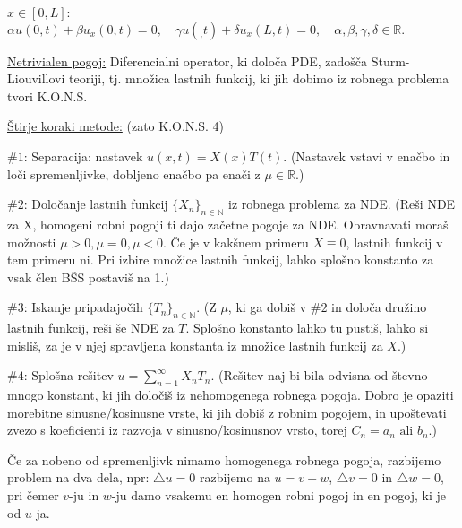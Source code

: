 \documentclass[8pt,a4paper]{amsart}
\theoremstyle{definition} %
\theoremstyle{plain} %
\newcommand{\R}{\mathbb R}
\newcommand{\N}{\mathbb N}
\begin{document}
$x \in [0,L]$: $\alpha u(0,t) + \beta u_x(0,t) = 0, \quad \gamma u(_,t)+\delta
u_x(L,t) = 0, \quad \alpha, \beta, \gamma, \delta \in \R.$

\underline{Netrivialen pogoj:} Diferencialni operator, ki določa PDE, zadošča
Sturm-Liouvillovi teoriji, tj. množica lastnih funkcij, ki jih dobimo iz robnega
problema tvori K.O.N.S.


\underline{Štirje koraki metode:} (zato K.O.N.S. 4)

$\#1$: Separacija: nastavek $u(x,t)=X(x)T(t)$. (Nastavek vstavi v enačbo in loči
spremenljivke, dobljeno enačbo pa enači z $\mu \in \R$.)

$\#2$: Določanje lastnih funkcij $\{X_n\}_{n\in \N}$ iz robnega problema za NDE.
(Reši NDE za X, homogeni robni pogoji ti dajo začetne pogoje za NDE. Obravnavati
moraš možnosti $\mu >0, \mu = 0, \mu < 0$. Če je v kakšnem primeru $X \equiv 0$,
lastnih funkcij v tem primeru ni. Pri izbire množice lastnih funkcij, lahko
splošno konstanto za vsak člen BŠS postaviš na 1.)

$\#3$: Iskanje pripadajočih $\{T_n \}_{n \in \N}$. (Z $\mu$, ki ga dobiš v $\#2$
in določa družino lastnih funkcij, reši še NDE za $T$. Splošno konstanto lahko
tu pustiš, lahko si misliš, za je v njej spravljena konstanta iz množice lastnih
funkcij za $X$.)

$\#4$: Splošna rešitev $u = \sum_{n=1}^\infty X_nT_n$. (Rešitev naj bi bila
odvisna od števno mnogo konstant, ki jih določiš iz nehomogenega robnega pogoja.
Dobro je opaziti morebitne sinusne/kosinusne vrste, ki jih dobiš z robnim
pogojem, in upoštevati zvezo s koeficienti iz razvoja v sinusno/kosinusnov
vrsto, torej $C_n = a_n \text{ ali } b_n$.)

Če za nobeno od spremenljivk nimamo homogenega robnega pogoja, razbijemo problem
na dva dela, npr: $\triangle u = 0$ razbijemo na $u = v+w$, $\triangle v = 0$ in
$\triangle w = 0$, pri čemer $v$-ju in $w$-ju damo vsakemu en homogen robni
pogoj in en pogoj, ki je od $u$-ja.

\end{document}
